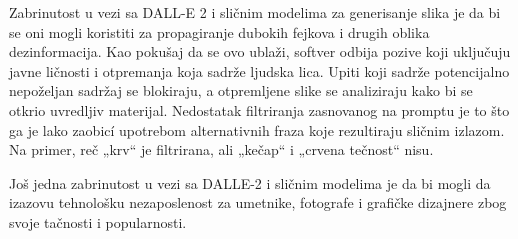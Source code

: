 \documentclass[a4paper]{article}
\begin{document}
Zabrinutost u vezi sa DALL-E 2 i sličnim modelima za generisanje slika je da bi se oni mogli koristiti za propagiranje dubokih fejkova i drugih oblika dezinformacija. Kao pokušaj da se ovo ublaži, softver odbija pozive koji uključuju javne ličnosti i otpremanja koja sadrže ljudska lica. Upiti koji sadrže potencijalno nepoželjan sadržaj se blokiraju, a otpremljene slike se analiziraju kako bi se otkrio uvredljiv materijal. Nedostatak filtriranja zasnovanog na promptu je to što ga je lako zaobicí upotrebom alternativnih fraza  koje rezultiraju sličnim izlazom. Na primer, reč „krv“ je filtrirana, ali „kečap“ i „crvena tečnost“ nisu.

Još jedna zabrinutost u vezi sa DALLE-2 i sličnim modelima je da bi mogli da izazovu tehnološku  nezaposlenost za umetnike, fotografe i grafičke dizajnere zbog svoje tačnosti i popularnosti.
\end{document}
